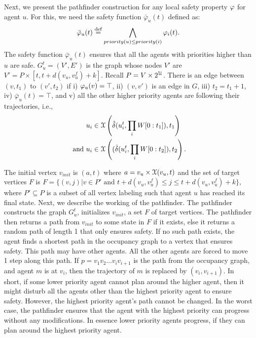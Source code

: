 Next, we present the pathfinder construction for any local safety property $\varphi$ for agent $u$. For this, we need the safety function $\bar{\varphi}_u(t)$ defined as:
\begin{equation}
\label{eq:safety}
    \bar{\varphi}_u(t) \stackrel{\text{def}}{=} \bigwedge_{priority(u)\leq priority(i)} \varphi_i(t).
\end{equation}
The safety function $\bar{\varphi}_u(t)$ ensures that all the agents with priorities higher than $u$ are safe.
$G_{u}^t = (V',E')$ is the graph whose nodes $V'$ are $V' = P \times [t,t+d(v_u,v_u^f)+k]$. Recall $P = V \times 2^{\mathcal{U}}$. There is an edge between $(v,t_1)$ to $(v',t_2)$ if i) $\varphi_u(v)  = \top$, ii) $(v,v')$ is an edge in $G$, iii) $t_2 = t_1 + 1$, iv) $\bar{\varphi}_u(t) = \top$, and v) all the other higher priority agents are following their trajectories, i.e., \begin{align}
        & u_i \in \mathcal{X}\left( \hat{\delta}(u_i^t,\prod_i W[0:t_1]),t_1 \right) \\
        \text{ and } 
        & u_i \in \mathcal{X}\left(( \hat{\delta}(u_i^t,\prod_i W[0:t_2]),t_2\right).
\end{align}
   
The initial vertex $v_{init}$ is $(a,t)$ where $a = v_u \times \mathcal{X}(v_u,t)$ and the set of target vertices $F$ is
$F=\{ (v,j)|v \in P' \text{ and } t+d(v_u,v_u^f) \leq j \leq t+d(v_u,v_u^f)+k \}$,
where $P' \subseteq P$ is a subset of all vertex labeling such that agent $u$ has reached its final state. %
Next, we describe the working of the pathfinder. The pathfinder constructs the graph $G_u^t$, initializes  $v_{init}$, a set $F$ of target vertices. The pathfinder then returns a path from $v_{init}$ to some state in $F$ if it exists, else it returns a random path of length 1 that only ensures safety. If no such path exists, the agent finds a shortest path in the occupancy graph to a vertex that ensures safety. This path may have other agents. All the other agents are forced to move 1 step along this path. If $p = v_1 v_2 \dots v_i v_{i+1}$ is the path from the occupancy graph, and agent $m$ is at $v_i$, then the trajectory of $m$ is replaced by $(v_i,v_{i+1})$. In short, if some lower priority agent cannot plan around the higher agent, then it might disturb all the agents other than the highest priority agent to ensure safety. However, the highest priority agent's path cannot be changed.
In the worst case, the pathfinder ensures that the agent with the highest priority can progress without any modifications. In essence lower priority agents progress, if they can plan around the highest priority agent.

